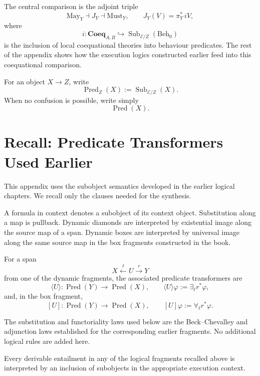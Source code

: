 The central comparison is the adjoint triple
\[
  \mathrm{May}_Y
  \dashv
  J_Y
  \dashv
  \mathrm{Must}_Y,
  \qquad
  J_Y(V)=\pi_Y^*\,iV,
\]
where
\[
  i:\mathbf{Coeq}_{A,B}
  \hookrightarrow
  \operatorname{Sub}_{\mathcal E/Z}(\mathrm{Beh}_0)
\]
is the inclusion of local coequational theories into behaviour predicates.
The rest of the appendix shows how the execution logics constructed earlier
feed into this coequational comparison.

For an object \(X\to Z\), write
\[
  \operatorname{Pred}_Z(X)
  :=
  \operatorname{Sub}_{\mathcal E/Z}(X).
\]
When no confusion is possible, write simply
\[
  \operatorname{Pred}(X).
\]

\section{Recall: Predicate Transformers Used Earlier}
\label{sec:base-subobject-calculus}

This appendix uses the subobject semantics developed in the earlier logical
chapters.  We recall only the clauses needed for the synthesis.

A formula in context denotes a subobject of its context object.  Substitution
along a map is pullback.  Dynamic diamonds are interpreted by existential
image along the source map of a span.  Dynamic boxes are interpreted by
universal image along the same source map in the box fragments constructed in
the book.

For a span
\[
  X\xleftarrow{\ell}U\xrightarrow{r}Y
\]
from one of the dynamic fragments, the associated predicate transformers are
\[
  \langle U\rangle:
  \operatorname{Pred}(Y)\to\operatorname{Pred}(X),
  \qquad
  \langle U\rangle\varphi
  :=
  \exists_{\ell}r^*\varphi,
\]
and, in the box fragment,
\[
  [U]:
  \operatorname{Pred}(Y)\to\operatorname{Pred}(X),
  \qquad
  [U]\varphi
  :=
  \forall_{\ell}r^*\varphi.
\]

The substitution and functoriality laws used below are the Beck--Chevalley
and adjunction laws established for the corresponding earlier fragments.
No additional logical rules are added here.

\begin{proposition}
\label{prop:base-subobject-calculus-soundness}
Every derivable entailment in any of the logical fragments recalled above is
interpreted by an inclusion of subobjects in the appropriate execution
context.
\end{proposition}

